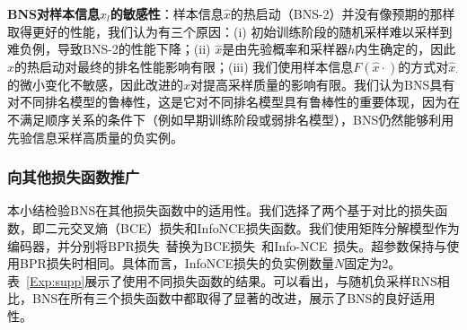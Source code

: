 \textbf{\textsf{BNS}对样本信息$\hat{x}_l$的敏感性}：样本信息$\hat{x}$的热启动（\textsf{BNS-2}）并没有像预期的那样取得更好的性能，我们认为有三个原因：(i) 初始训练阶段的随机采样难以采样到难负例，导致\textsf{BNS-2}的性能下降；(ii) $\hat{x}$是由先验概率和采样器$h$内生确定的，因此$\hat{x}$的热启动对最终的排名性能影响有限；(iii) 我们使用样本信息$F(\hat{x}\cdot)$的方式对$\hat{x}_\cdot$的微小变化不敏感，因此改进的$\hat{x}$对提高采样质量的影响有限。我们认为\textsf{BNS}具有对不同排名模型的鲁棒性，这是它对不同排名模型具有鲁棒性的重要体现，因为在不满足顺序关系的条件下（例如早期训练阶段或弱排名模型），\textsf{BNS}仍然能够利用先验信息采样高质量的负实例。

\subsubsection{向其他损失函数推广}\label{Appendix:LossFunc}
本小结检验\textsf{BNS}在其他损失函数中的适用性。我们选择了两个基于对比的损失函数，即二元交叉熵（BCE）损失和InfoNCE损失函数。我们使用矩阵分解模型作为编码器，并分别将BPR损失~\cite{Steffen:2009:UAI}替换为BCE损失~\cite{Zizhuo:2021:ICDM}和Info-NCE~\cite{Oord:2018:arxiv}损失。超参数保持与使用BPR损失时相同。具体而言，InfoNCE损失的负实例数量$N$固定为2。表~\ref{Exp:supp}展示了使用不同损失函数的结果。可以看出，与随机负采样\textsf{RNS}相比，\textsf{BNS}在所有三个损失函数中都取得了显著的改进，展示了\textsf{BNS}的良好适用性。
